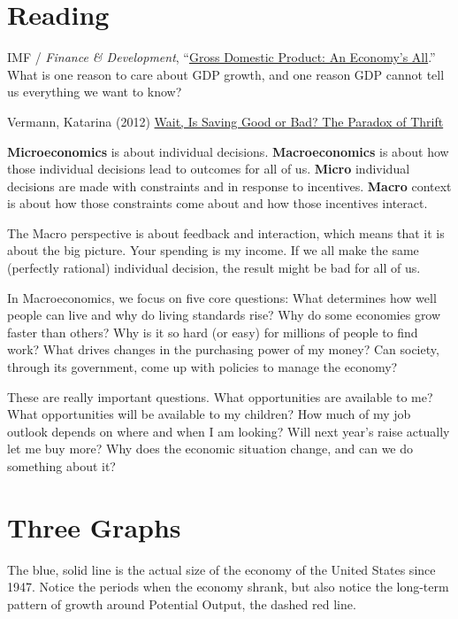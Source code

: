 \documentclass[
  letterpaper,
  DIV=11,
  numbers=noendperiod]{scrreprt}
\begin{document}
\section{Reading}\label{reading}

IMF / \emph{Finance \& Development},
``\href{https://www.imf.org/external/pubs/ft/fandd/basics/14_gdp.htm}{Gross
Domestic Product: An Economy's All}.'' What is one reason to care about
GDP growth, and one reason GDP cannot tell us everything we want to
know?

Vermann, Katarina (2012)
\href{https://www.stlouisfed.org/publications/page-one-economics/2012/05/01/wait-is-saving-good-or-bad-the-paradox-of-thrift}{Wait,
Is Saving Good or Bad? The Paradox of Thrift}

\textbf{Microeconomics} is about individual decisions.
\textbf{Macroeconomics} is about how those individual decisions lead to
outcomes for all of us. \textbf{Micro} individual decisions are made
with constraints and in response to incentives. \textbf{Macro} context
is about how those constraints come about and how those incentives
interact.

The Macro perspective is about feedback and interaction, which means
that it is about the big picture. Your spending is my income. If we all
make the same (perfectly rational) individual decision, the result might
be bad for all of us.

In Macroeconomics, we focus on five core questions: What determines how
well people can live and why do living standards rise? Why do some
economies grow faster than others? Why is it so hard (or easy) for
millions of people to find work? What drives changes in the purchasing
power of my money? Can society, through its government, come up with
policies to manage the economy?

These are really important questions. What opportunities are available
to me? What opportunities will be available to my children? How much of
my job outlook depends on where and when I am looking? Will next year's
raise actually let me buy more? Why does the economic situation change,
and can we do something about it?

\section{Three Graphs}\label{three-graphs}

The blue, solid line is the actual size of the economy of the United
States since 1947. Notice the periods when the economy shrank, but also
notice the long-term pattern of growth around Potential Output, the
dashed red line.
\end{document}
